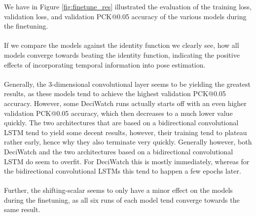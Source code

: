 \documentclass[./main.tex]{subfiles}
\begin{document}
We have in Figure \ref{fig:finetune_res} illustrated the evaluation of the training loss, validation loss, and validation PCK@0.05 accuracy of the various models during the finetuning.
\\
\\
If we compare the models against the identity function we clearly see, how all models converge towards beating the identity function, indicating the positive effects of incorporating temporal information into pose estimation.
\\
\\
Generally, the 3-dimensional convolutional layer seems to be yielding the greatest results, as these models tend to achieve the highest validation PCK@0.05 accuracy. However, some DeciWatch runs actually starts off with an even higher validation PCK@0.05 accuracy, which then decreases to a much lower value quickly. The two architectures that are based on a bidirectional convolutional LSTM tend to yield some decent results, however, their training tend to plateau rather early, hence why they also terminate very quickly. Generally however, both DeciWatch and the two architectures based on a bidirectional convolutional LSTM do seem to overfit. For DeciWatch this is mostly immediately, whereas for the bidirectional convolutional LSTMs this tend to happen a few epochs later.
\\
\\
Further, the shifting-scalar seems to only have a minor effect on the models during the finetuning, as all six runs of each model tend converge towards the same result.
\end{document}
